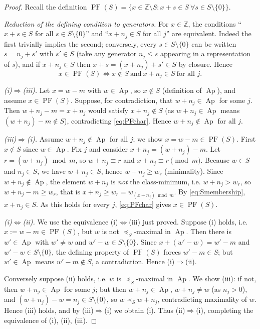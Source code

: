 \documentclass{amsart}
\theoremstyle{definition}
\DeclareMathOperator{\Ap}{Ap}
\DeclareMathOperator{\PF}{PF}
\newcommand{\ZZ}{\mathbb{Z}}
\begin{document}
\begin{proof}
Recall the definition
$\PF(S)=\{x\in\ZZ\setminus S: x+s\in S\ \forall s\in S\setminus\{0\}\}$.

\emph{Reduction of the defining condition to generators.} For $x\in\ZZ$,
the conditions ``$x+s\in S$ for all $s\in S\setminus\{0\}$'' and
``$x+n_j\in S$ for all $j$'' are equivalent. Indeed the first trivially
implies the second; conversely, every $s\in S\setminus\{0\}$ can be written
$s=n_j+s'$ with $s'\in S$ (take any generator $n_j\le s$ appearing in a
representation of $s$), and if $x+n_j\in S$ then $x+s=(x+n_j)+s'\in S$ by
closure. Hence
\begin{equation}\label{eq:PFchar}
x\in\PF(S)\iff x\notin S\ \text{and}\ x+n_j\in S\ \text{for all }j.
\end{equation}

\emph{(i)$\Rightarrow$(iii).} Let $x=w-m$ with $w\in\Ap$, so $x\notin S$
(definition of $\Ap$), and assume $x\in\PF(S)$. Suppose, for contradiction,
that $w+n_{j}\in\Ap$ for some $j$. Then
$w+n_j-m=x+n_j$ would satisfy $x+n_j\notin S$ (as $w+n_j\in\Ap$ means
$(w+n_j)-m\notin S$), contradicting \eqref{eq:PFchar}. Hence
$w+n_j\notin\Ap$ for all $j$.

\emph{(iii)$\Rightarrow$(i).} Assume $w+n_j\notin\Ap$ for all $j$; we show
$x=w-m\in\PF(S)$. First $x\notin S$ since $w\in\Ap$. Fix $j$ and consider
$x+n_j=(w+n_j)-m$. Let $r=(w+n_j)\bmod m$, so
$w+n_j\equiv r$ and $x+n_j\equiv r\pmod m$. Because $w\in S$ and $n_j\in S$,
we have $w+n_j\in S$, hence $w+n_j\ge w_r$ (minimality). Since
$w+n_j\notin\Ap$, the element $w+n_j$ is \emph{not} the class-minimum, i.e.
$w+n_j>w_r$, so $w+n_j-m\ge w_r$, that is $x+n_j\ge w_r=w_{(x+n_j)\bmod m}$.
By \eqref{eq:Smembership}, $x+n_j\in S$. As this holds for every $j$,
\eqref{eq:PFchar} gives $x\in\PF(S)$.

\emph{(i)$\Leftrightarrow$(ii).} We use the equivalence (i)$\Leftrightarrow$(iii)
just proved. Suppose (i) holds, i.e. $x:=w-m\in\PF(S)$, but $w$ is not
$\preceq_S$-maximal in $\Ap$. Then there is $w'\in\Ap$ with $w'\ne w$ and
$w'-w\in S\setminus\{0\}$. Since $x+(w'-w)=w'-m$ and $w'-w\in S\setminus
\{0\}$, the defining property of $\PF(S)$ forces $w'-m\in S$; but
$w'\in\Ap$ means $w'-m\notin S$, a contradiction. Hence (i)$\Rightarrow$(ii).

Conversely suppose (ii) holds, i.e. $w$ is $\preceq_S$-maximal in $\Ap$. We
show (iii): if not, then $w+n_j\in\Ap$ for some $j$; but then $w+n_j\in\Ap$,
$w+n_j\ne w$ (as $n_j>0$), and $(w+n_j)-w=n_j\in S\setminus\{0\}$, so
$w\prec_S w+n_j$, contradicting maximality of $w$. Hence (iii) holds, and by
(iii)$\Rightarrow$(i) we obtain (i). Thus (ii)$\Rightarrow$(i), completing
the equivalence of (i), (ii), (iii).


\end{proof}
\end{document}
